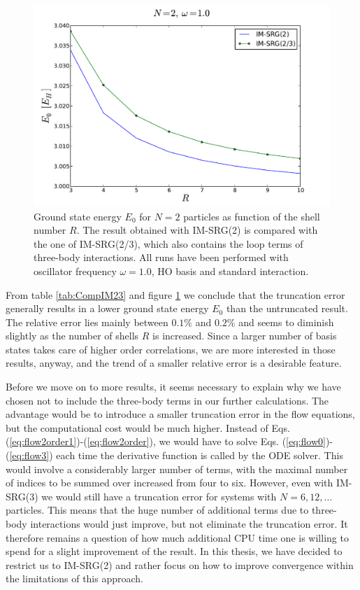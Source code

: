 \begin{figure}
\begin{center}
\includegraphics[scale=0.4]{../Plots/imsrg23.pdf}
\end{center}
\caption{Ground state energy $E_0$ for $N=2$ particles as function of the shell number $R$. The result obtained with IM-SRG(2) is compared with the one of IM-SRG(2/3), which also contains the loop terms of three-body interactions. All runs have been performed with oscillator frequency $\omega = 1.0$, HO basis and standard interaction.}
\label{fig:imsrg23}
\end{figure}

From table \ref{tab:CompIM23} and figure \ref{fig:imsrg23} we conclude that the truncation error generally results in a lower ground state energy $E_0$ than the untruncated result. The relative error lies mainly between $0.1 \%$ and $0.2 \%$ and seems to diminish slightly as the number of shells $R$ is increased. Since a larger number of basis states takes care of higher order correlations, we are more interested in those results, anyway, and the trend of a smaller relative error is a desirable feature.

Before we move on to more results, it seems necessary to explain why we have chosen not to include the three-body terms in our further calculations. The advantage would be to introduce a smaller truncation error in the flow equations, but the computational cost would be much higher. Instead of Eqs. (\ref{eq:flow2order1})-(\ref{eq:flow2order}), we would have to solve Eqs. (\ref{eq:flow0})-(\ref{eq:flow3}) each time the derivative function is called by the ODE solver. This would involve a considerably larger number of terms, with the maximal number of indices to be summed over increased from four to six. However, even with IM-SRG(3) we would still have a truncation error for systems with $N=6,12,\dots$ particles.
 This means that the huge number of additional terms due to three-body interactions would just improve, but not eliminate the truncation error. It therefore remains a question of how much additional CPU time one is willing to spend for a slight improvement of the result. In this thesis, we have decided to restrict us to IM-SRG(2) and rather focus on how to improve convergence within the limitations of this approach.

